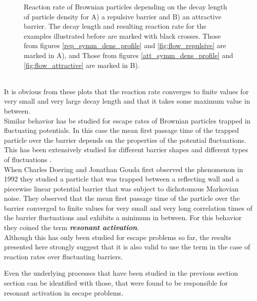 \begin{minipage}[t]{1 \textwidth}
    \begin{figure}[H]
        \caption{Reaction rate of Brownian particles depending on the decay length of particle density for A) a repulsive barrier and B) an attractive barrier. The decay length and resulting reaction rate for the examples illustrated before are marked with black crosses. Those from figures \ref{rep_symm_dens_profile} and \ref{fig:flow_repulsive}  are marked in A), and Those from figures \ref{att_symm_dens_profile} and \ref{fig:flow_attractive} are marked in B).\label{reaction_rate_examples}}
    \end{figure}
\end{minipage}
\vspace{.5 cm} \\
It is obvious from these plots that the reaction rate converges to finite values for very small and very large decay length and that it takes some maximum value in between. \\
Similar behavior has be studied for escape rates of Brownian particles trapped in fluctuating potentials. In this case the mean first passage time of the trapped particle over the barrier depends on the properties of the potential fluctuations. This has been extensively studied for different barrier shapes and different types of fluctuations \cite{Doering1992, Zurcher1993, Hanggi1994, Pechukas1994,Reimann1995a, Reimann1995}. \\
When Charles Doering and Jonathan Gouda first observed the phenomenon in 1992 \cite{Doering1992} they studied a particle that was trapped between a reflecting wall and a piecewise linear potential barrier that was subject to dichotomous Markovian noise. They observed that the mean first passage time of the particle over the barrier converged to finite values for very small and very long correlation times of the barrier fluctuations and exhibits a minimum in between. For this behavior they coined the term\textbf{ \emph{resonant activation}}.\\
Although this has only been studied for escape problems so far, the results presented here strongly suggest that it is also valid to use the term in the case of reaction rates over fluctuating barriers. \par
Even the underlying processes that have been studied in the previous section section can be identified with those, that were found to be responsible for resonant activation in escape problems.
